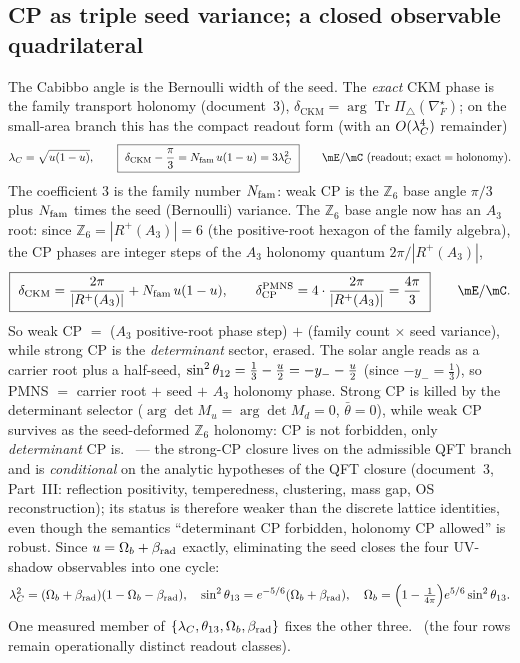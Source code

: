 \subsection{CP as triple seed variance; a closed observable quadrilateral}
The Cabibbo angle is the Bernoulli width of the seed. The \emph{exact} CKM phase is the family
transport holonomy (document~3), $\delta_{\mathrm{CKM}}=\arg\operatorname{Tr}\Pi_\triangle(\nabla_F^\star)$; on the
small-area branch this has the compact readout form (with an $O(\lambda_C^4)$ remainder)
\begin{equation}
  \lC=\sqrt{\useed(1-\useed)},\qquad
  \boxed{\ \delta_{\mathrm{CKM}}-\frac{\pi}{3}=\Nfam\,\useed(1-\useed)=3\lC^2\ }\qquad\mE/\mC\ (\text{readout; exact}=\text{holonomy}) .
\end{equation}
The coefficient $3$ is the family number $N_{\mathrm{fam}}$: weak CP is the $\mathbb Z_6$ base angle $\pi/3$
plus $N_{\mathrm{fam}}$ times the seed (Bernoulli) variance. The $\mathbb Z_6$ base angle now has an $A_3$ root:
since $\mathbb Z_6=|R^+(A_3)|=6$ (the positive-root hexagon of the family algebra), the CP phases are
integer steps of the $A_3$ holonomy quantum $2\pi/|R^+(A_3)|$,
\begin{equation}
  \boxed{\ \delta_{\mathrm{CKM}}=\frac{2\pi}{|R^+(A_3)|}+\Nfam\,\useed(1-\useed),\qquad
  \delta^{\mathrm{PMNS}}_{\mathrm{CP}}=4\cdot\frac{2\pi}{|R^+(A_3)|}=\frac{4\pi}{3}\ }\qquad\mE/\mC .
\end{equation}
So weak CP $=$ ($A_3$ positive-root phase step) $+$ (family count $\times$ seed variance), while strong
CP is the \emph{determinant} sector, erased. The solar angle reads as a carrier root plus a half-seed,
$\sin^2\theta_{12}=\tfrac13-\tfrac{u}{2}=-y_- - \tfrac{u}{2}$ (since $-y_-=\tfrac13$), so
PMNS $=$ carrier root $+$ seed $+$ $A_3$ holonomy phase. \mC
Strong CP is killed by the determinant selector ($\arg\det M_u=\arg\det M_d=0$, $\bar\theta=0$),
while weak CP survives as the seed-deformed $\mathbb Z_6$ holonomy: CP is not forbidden, only
\emph{determinant} CP is. \mC\ --- the strong-CP closure lives on the admissible QFT branch and is
\emph{conditional} on the analytic hypotheses of the QFT closure (document~3, Part~III: reflection positivity, temperedness,
clustering, mass gap, OS reconstruction); its status is therefore weaker than the discrete lattice
identities, even though the semantics ``determinant CP forbidden, holonomy CP allowed'' is robust. Since $u=\Omega_b+\beta_{\mathrm{rad}}$ exactly, eliminating the seed closes the
four UV-shadow observables into one cycle:
\begin{equation}
  \lambda_C^2=(\Omega_b+\beta_{\mathrm{rad}})(1-\Omega_b-\beta_{\mathrm{rad}}),\quad
  \sin^2\theta_{13}=e^{-5/6}(\Omega_b+\beta_{\mathrm{rad}}),\quad
  \Omega_b=\Bigl(1-\tfrac{1}{4\pi}\Bigr)e^{5/6}\sin^2\theta_{13}. 
\end{equation}
One measured member of $\{\lambda_C,\theta_{13},\Omega_b,\beta_{\mathrm{rad}}\}$ fixes the other three. \mE\ (the four
rows remain operationally distinct readout classes).

